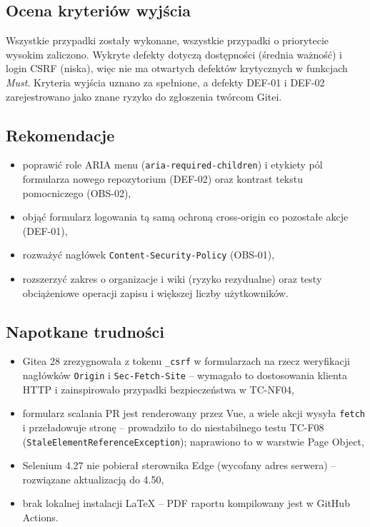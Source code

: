 \documentclass[11pt,a4paper]{article}
\begin{document}
\subsection{Ocena kryteriów wyjścia}
Wszystkie przypadki zostały wykonane, wszystkie przypadki o priorytecie wysokim zaliczono.
Wykryte defekty dotyczą dostępności (średnia ważność) i login CSRF (niska), więc nie ma otwartych
defektów krytycznych w funkcjach \emph{Must}. Kryteria wyjścia uznano za spełnione, a defekty
DEF-01 i DEF-02 zarejestrowano jako znane ryzyko do zgłoszenia twórcom Gitei.

\subsection{Rekomendacje}
\begin{itemize}
  \item poprawić role ARIA menu (\texttt{aria-required-children}) i etykiety pól formularza
        nowego repozytorium (DEF-02) oraz kontrast tekstu pomocniczego (OBS-02),
  \item objąć formularz logowania tą samą ochroną cross-origin co pozostałe akcje (DEF-01),
  \item rozważyć nagłówek \texttt{Content-Security-Policy} (OBS-01),
  \item rozszerzyć zakres o organizacje i wiki (ryzyko rezydualne) oraz testy obciążeniowe
        operacji zapisu i większej liczby użytkowników.
\end{itemize}

\subsection{Napotkane trudności}
\begin{itemize}
  \item Gitea 28 zrezygnowała z tokenu \texttt{\_csrf} w formularzach na rzecz weryfikacji
        nagłówków \texttt{Origin} i \texttt{Sec-Fetch-Site} -- wymagało to dostosowania klienta HTTP
        i zainspirowało przypadki bezpieczeństwa w TC-NF04,
  \item formularz scalania PR jest renderowany przez Vue, a wiele akcji wysyła \texttt{fetch}
        i przeładowuje stronę -- prowadziło to do niestabilnego testu TC-F08
        (\texttt{StaleElementReferenceException}); naprawiono to w warstwie Page Object,
  \item Selenium 4.27 nie pobierał sterownika Edge (wycofany adres serwera) -- rozwiązane aktualizacją do 4.50,
  \item brak lokalnej instalacji LaTeX -- PDF raportu kompilowany jest w GitHub Actions.
\end{itemize}
\end{document}

